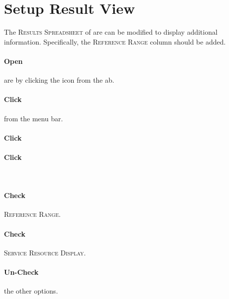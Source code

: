 \section{Setup Result View}

The \textsc{Results Spreadsheet} of \Gls{are} can be modified to display additional information. Specifically, the \textsc{Reference Range} column should be added.

\paragraph{Open} \gls{are} by clicking the  icon from the \gls{ab}.

\paragraph{Click}  from the menu bar.\\


\paragraph{Click} 

\paragraph{Click} \\


\paragraph{Check \faCheckSquareO} \textsc{Reference Range}.

\paragraph{Check \faCheckSquareO} \textsc{Service Resource Display}.\\


\paragraph{Un-Check \faSquareO} the other options.\\

